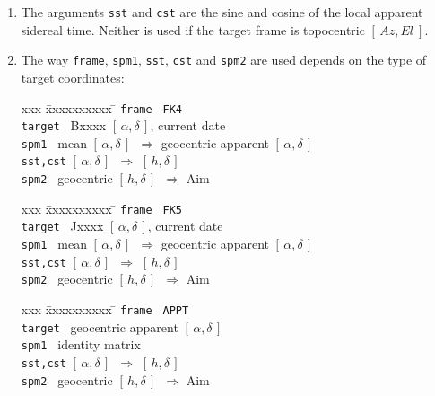 \documentclass[12pt,fleqn,twoside]{article}
\renewcommand{\_}{{\tt\char'137}}     %
\newcommand{\radec}     {$[\,\alpha,\delta\,]$}
\newcommand{\hadec}     {$[\,h,\delta\,]$}
\newcommand{\azel}      {$[\,Az,El~]$}
\begin{document}
{\begin{enumerate}
      In the present case, the encoder demands required to image the
      specified sky target at the specified pointing-origin are
      calculated.  The {\sc Aim} vector, an intermediate result, is also
      returned, so that it can be used in a subsequent call to the
      {\tt tcsRotator} function.
\item The arguments {\tt sst} and {\tt cst}
      are the sine and cosine of the local
      apparent sidereal time.  Neither is used if the target frame is
      topocentric \azel.
\item The way {\tt frame}, {\tt spm1}, {\tt sst}, {\tt cst} and
      {\tt spm2} are used depends on the type of target coordinates:
      \begin{tabbing}
         xxx \= xxxxxxxxxx \= \kill
         \> {\tt frame  } \> {\tt FK4} \\
         \> {\tt target } \> Bxxxx \radec, current date \\
         \> {\tt spm1   } \>
                 mean \radec\ $\Rightarrow$ geocentric apparent \radec \\
         \> {\tt sst,cst} \> \radec\ $\Rightarrow$ \hadec \\
         \> {\tt spm2   } \>  geocentric \hadec\ $\Rightarrow$ {\sc Aim}
      \end{tabbing}
      \begin{tabbing}
         xxx \= xxxxxxxxxx \= \kill
         \> {\tt frame  } \> {\tt FK5} \\
         \> {\tt target } \> Jxxxx \radec, current date \\
         \> {\tt spm1   } \>
                 mean \radec\ $\Rightarrow$ geocentric apparent \radec \\
         \> {\tt sst,cst} \> \radec\ $\Rightarrow$ \hadec \\
         \> {\tt spm2   } \> geocentric \hadec\ $\Rightarrow$ {\sc Aim}
      \end{tabbing}
      \begin{tabbing}
         xxx \= xxxxxxxxxx \= \kill
         \> {\tt frame  } \> {\tt APPT} \\
         \> {\tt target } \> geocentric apparent \radec \\
         \> {\tt spm1   } \> identity matrix \\
         \> {\tt sst,cst} \> \radec\ $\Rightarrow$ \hadec \\
         \> {\tt spm2   } \> geocentric \hadec\ $\Rightarrow$ {\sc Aim}
      \end{tabbing}

\end{enumerate}}
\end{document}
